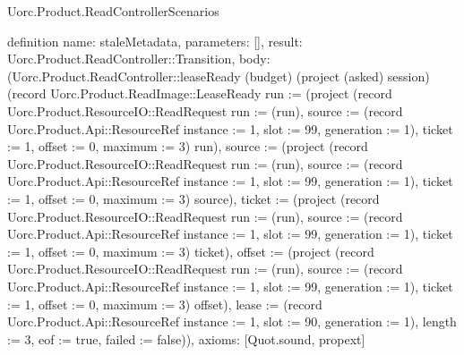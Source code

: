 \begin{lexlean}{Uorc.Product.ReadControllerScenarios}
\begin{semanticmodule}
definition{
  name: staleMetadata,
  parameters: [],
  result: Uorc.Product.ReadController::Transition,
  body: (Uorc.Product.ReadController::leaseReady (budget) (project (asked) session) (record Uorc.Product.ReadImage::LeaseReady {run := (project (record Uorc.Product.ResourceIO::ReadRequest {run := (run), source := (record Uorc.Product.Api::ResourceRef {instance := 1, slot := 99, generation := 1}), ticket := 1, offset := 0, maximum := 3}) run), source := (project (record Uorc.Product.ResourceIO::ReadRequest {run := (run), source := (record Uorc.Product.Api::ResourceRef {instance := 1, slot := 99, generation := 1}), ticket := 1, offset := 0, maximum := 3}) source), ticket := (project (record Uorc.Product.ResourceIO::ReadRequest {run := (run), source := (record Uorc.Product.Api::ResourceRef {instance := 1, slot := 99, generation := 1}), ticket := 1, offset := 0, maximum := 3}) ticket), offset := (project (record Uorc.Product.ResourceIO::ReadRequest {run := (run), source := (record Uorc.Product.Api::ResourceRef {instance := 1, slot := 99, generation := 1}), ticket := 1, offset := 0, maximum := 3}) offset), lease := (record Uorc.Product.Api::ResourceRef {instance := 1, slot := 90, generation := 1}), length := 3, eof := true, failed := false})),
  axioms: [Quot.sound, propext]
}


\end{semanticmodule}
\end{lexlean}
